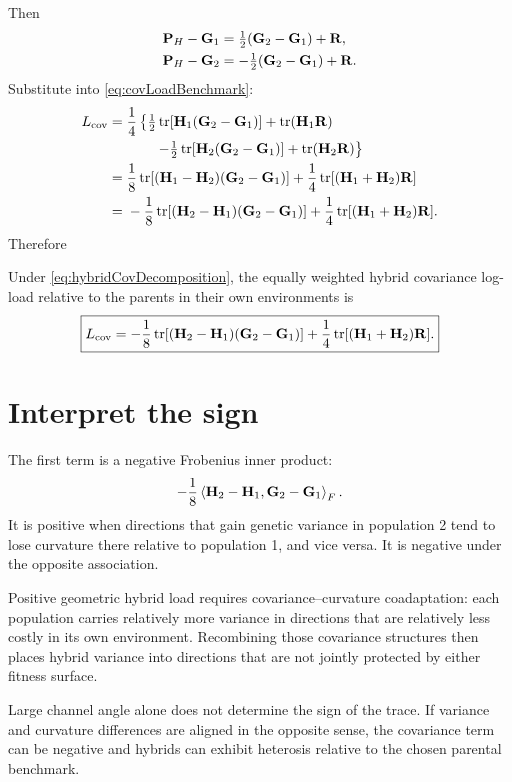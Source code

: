 Then
\begin{align}
\mathbf{P}_H-\mathbf{G}_1
&=\tfrac12(\mathbf{G}_2-\mathbf{G}_1)+\mathbf{R},\\
\mathbf{P}_H-\mathbf{G}_2
&=-\tfrac12(\mathbf{G}_2-\mathbf{G}_1)+\mathbf{R}.
\end{align}
Substitute into \cref{eq:covLoadBenchmark}:
\begin{align}
L_{\mathrm{cov}}
={}&\frac14\left\{
\tfrac12\operatorname{tr}[\mathbf{H}_1(\mathbf{G}_2-\mathbf{G}_1)]
+\operatorname{tr}(\mathbf{H}_1\mathbf{R})\right.\\
&\left.\qquad
-\tfrac12\operatorname{tr}[\mathbf{H}_2(\mathbf{G}_2-\mathbf{G}_1)]
+\operatorname{tr}(\mathbf{H}_2\mathbf{R})
\right\}\\
={}&\frac18\operatorname{tr}[(\mathbf{H}_1-\mathbf{H}_2)(\mathbf{G}_2-\mathbf{G}_1)]
+\frac14\operatorname{tr}[(\mathbf{H}_1+\mathbf{H}_2)\mathbf{R}]\\
={}&-\frac18\operatorname{tr}[(\mathbf{H}_2-\mathbf{H}_1)(\mathbf{G}_2-\mathbf{G}_1)]
+\frac14\operatorname{tr}[(\mathbf{H}_1+\mathbf{H}_2)\mathbf{R}].
\end{align}
Therefore
\begin{theorem}
Under \cref{eq:hybridCovDecomposition}, the equally weighted hybrid covariance log-load relative to the parents in their own environments is
\begin{equation}
\boxed{
L_{\mathrm{cov}}
=-\frac18\operatorname{tr}[(\mathbf{H}_2-\mathbf{H}_1)(\mathbf{G}_2-\mathbf{G}_1)]
+\frac14\operatorname{tr}[(\mathbf{H}_1+\mathbf{H}_2)\mathbf{R}].}
\label{eq:generalTraceIdentity}
\end{equation}
\end{theorem}

\section{Interpret the sign}

The first term is a negative Frobenius inner product:
\begin{equation}
-\frac18\left\langle \mathbf{H}_2-\mathbf{H}_1,\mathbf{G}_2-\mathbf{G}_1\right\rangle_F.
\end{equation}
It is positive when directions that gain genetic variance in population 2 tend to lose curvature there relative to population 1, and vice versa. It is negative under the opposite association.

\begin{biobox}
Positive geometric hybrid load requires covariance--curvature coadaptation: each population carries relatively more variance in directions that are relatively less costly in its own environment. Recombining those covariance structures then places hybrid variance into directions that are not jointly protected by either fitness surface.
\end{biobox}

\begin{cautionbox}
Large channel angle alone does not determine the sign of the trace. If variance and curvature differences are aligned in the opposite sense, the covariance term can be negative and hybrids can exhibit heterosis relative to the chosen parental benchmark.
\end{cautionbox}

